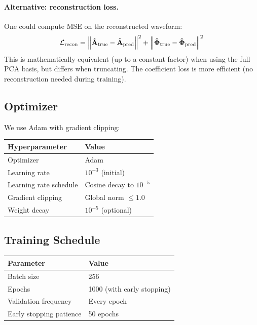 \documentclass[11pt,a4paper]{article}
\begin{document}
\paragraph{Alternative: reconstruction loss.}
One could compute MSE on the reconstructed waveform:
\begin{equation}
    \mathcal{L}_{\rm recon} = \left\| \hat{\mathbf{A}}_{\rm true} - \hat{\mathbf{A}}_{\rm pred} \right\|^2 + \left\| \hat{\mathbf{\Phi}}_{\rm true} - \hat{\mathbf{\Phi}}_{\rm pred} \right\|^2
\end{equation}
This is mathematically equivalent (up to a constant factor) when using the full PCA basis, but differs when truncating. The coefficient loss is more efficient (no reconstruction needed during training).

\subsection{Optimizer}

We use Adam with gradient clipping:
\begin{center}
\begin{tabular}{ll}
\toprule
Hyperparameter & Value \\
\midrule
Optimizer & Adam \\
Learning rate & $10^{-3}$ (initial) \\
Learning rate schedule & Cosine decay to $10^{-5}$ \\
Gradient clipping & Global norm $\leq 1.0$ \\
Weight decay & $10^{-5}$ (optional) \\
\bottomrule
\end{tabular}
\end{center}

\subsection{Training Schedule}

\begin{center}
\begin{tabular}{ll}
\toprule
Parameter & Value \\
\midrule
Batch size & 256 \\
Epochs & 1000 (with early stopping) \\
Validation frequency & Every epoch \\
Early stopping patience & 50 epochs \\
\bottomrule
\end{tabular}
\end{center}
\end{document}
